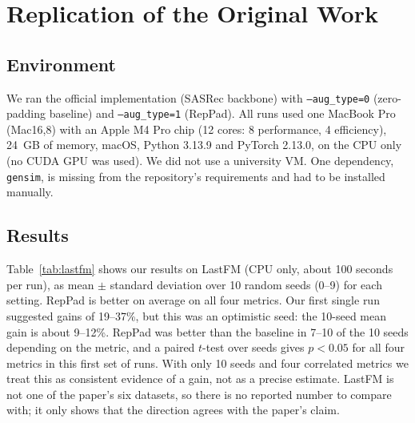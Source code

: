 \documentclass[11pt]{article}
\begin{document}
\section{Replication of the Original Work}

\subsection{Environment}

We ran the official implementation (SASRec backbone) with \texttt{--aug\_type=0}
(zero-padding baseline) and \texttt{--aug\_type=1} (RepPad).
All runs used one MacBook Pro (Mac16,8) with an Apple M4 Pro chip (12 cores: 8 performance, 4 efficiency), 24~GB of memory, macOS, Python 3.13.9 and PyTorch 2.13.0, on the CPU only (no CUDA GPU was used). We did not use a university VM. One dependency, \texttt{gensim},
is missing from the repository's requirements and had to be installed manually.

\subsection{Results}

Table~\ref{tab:lastfm} shows our results on LastFM (CPU only, about 100 seconds
per run), as mean $\pm$ standard deviation over 10 random seeds (0--9) for each
setting. RepPad is better on average on all four metrics. Our first
single run suggested gains of 19--37\%, but this was an optimistic seed: the
10-seed mean gain is about 9--12\%. RepPad was better than the baseline in 7--10
of the 10 seeds depending on the metric, and a paired $t$-test over seeds gives
$p<0.05$ for all four metrics in this first set of runs. With only 10 seeds and four correlated metrics we
treat this as consistent evidence of a gain, not as a precise estimate. LastFM is
not one of the paper's six datasets, so there is no reported number to compare
with; it only shows that the direction agrees with the paper's claim.

\begin{table}[t]
\centering
\small
{}
\caption{SASRec on LastFM with the official code, mean $\pm$ std over 10 seeds.}
\label{tab:lastfm}
\end{table}
\end{document}
